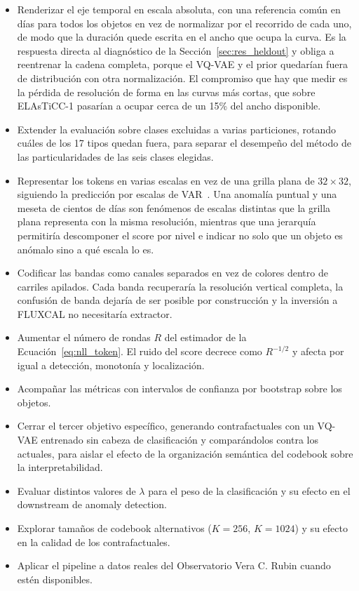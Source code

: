 \begin{itemize}
    \item Renderizar el eje temporal en escala absoluta, con una referencia común en días para todos los objetos en vez de normalizar por el recorrido de cada uno, de modo que la duración quede escrita en el ancho que ocupa la curva. Es la respuesta directa al diagnóstico de la Sección~\ref{sec:res_heldout} y obliga a reentrenar la cadena completa, porque el VQ-VAE y el prior quedarían fuera de distribución con otra normalización. El compromiso que hay que medir es la pérdida de resolución de forma en las curvas más cortas, que sobre ELAsTiCC-1 pasarían a ocupar cerca de un 15\% del ancho disponible.
    \item Extender la evaluación sobre clases excluidas a varias particiones, rotando cuáles de los 17 tipos quedan fuera, para separar el desempeño del método de las particularidades de las seis clases elegidas.
    \item Representar los tokens en varias escalas en vez de una grilla plana de $32 \times 32$, siguiendo la predicción por escalas de VAR~\cite{tian2024var}. Una anomalía puntual y una meseta de cientos de días son fenómenos de escalas distintas que la grilla plana representa con la misma resolución, mientras que una jerarquía permitiría descomponer el score por nivel e indicar no solo que un objeto es anómalo sino a qué escala lo es.
    \item Codificar las bandas como canales separados en vez de colores dentro de carriles apilados. Cada banda recuperaría la resolución vertical completa, la confusión de banda dejaría de ser posible por construcción y la inversión a FLUXCAL no necesitaría extractor.
    \item Aumentar el número de rondas $R$ del estimador de la Ecuación~\ref{eq:nll_token}. El ruido del score decrece como $R^{-1/2}$ y afecta por igual a detección, monotonía y localización.
    \item Acompañar las métricas con intervalos de confianza por bootstrap sobre los objetos.
    \item Cerrar el tercer objetivo específico, generando contrafactuales con un VQ-VAE entrenado sin cabeza de clasificación y comparándolos contra los actuales, para aislar el efecto de la organización semántica del codebook sobre la interpretabilidad.
    \item Evaluar distintos valores de $\lambda$ para el peso de la clasificación y su efecto en el downstream de anomaly detection.
    \item Explorar tamaños de codebook alternativos ($K = 256$, $K = 1024$) y su efecto en la calidad de los contrafactuales.
    \item Aplicar el pipeline a datos reales del Observatorio Vera C. Rubin cuando estén disponibles.
\end{itemize}
